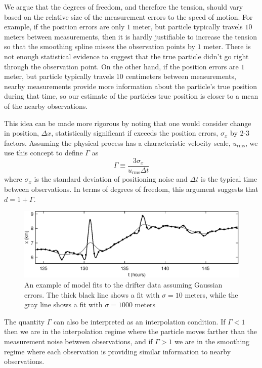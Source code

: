 \documentclass[twocol]{ametsoc}
\begin{document}
We argue that the degrees of freedom, and therefore the tension, should vary based on the relative size of the measurement errors to the speed of motion. For example, if the position errors are only $1$ meter, but particle typically travels $10$ meters between measurements, then it is hardly justifiable to increase the tension so that the smoothing spline misses the observation points by $1$ meter. There is not enough statistical evidence to suggest that the true particle didn't go right through the observation point. On the other hand, if the position errors are  $1$ meter, but particle typically travels $10$ centimeters between measurements, nearby measurements provide more information about the particle's true position during that time, so our estimate of the particles true position is closer to a mean of the nearby observations.

This idea can be made more rigorous by noting that one would consider change in position, $\Delta x$, statistically significant if exceeds the position errors, $\sigma_x$ by 2-3 factors. Assuming the physical process has a characteristic velocity scale, $u_{\textrm{rms}}$, we use this concept to define $\Gamma$ as
\begin{equation}
\label{gamma_equation}
\Gamma \equiv \frac{3 \sigma_x}{u_{\textrm{rms}}\Delta t}
\end{equation}
where $\sigma_x$ is the standard deviation of positioning noise and $\Delta t$ is the typical time between observations. In terms of degrees of freedom, this argument suggests that $d = 1 + \Gamma$.

\begin{figure}[t]
  \centerline{\includegraphics[width=39pc,angle=0]{gaussianfit}}
  
  \caption{An example of model fits to the drifter data assuming Gaussian errors. The thick black line shows a fit with $\sigma=10$ meters, while the gray line shows a fit with $\sigma=1000$ meters}
  \label{gaussianfit}
\end{figure}

The quantity $\Gamma$ can also be interpreted as an interpolation condition. If $\Gamma<1$ then we are in the interpolation regime where the particle moves farther than the measurement noise between observations, and if $\Gamma >1$ we are in the smoothing regime where each observation is providing similar information to nearby observations.
\end{document}
